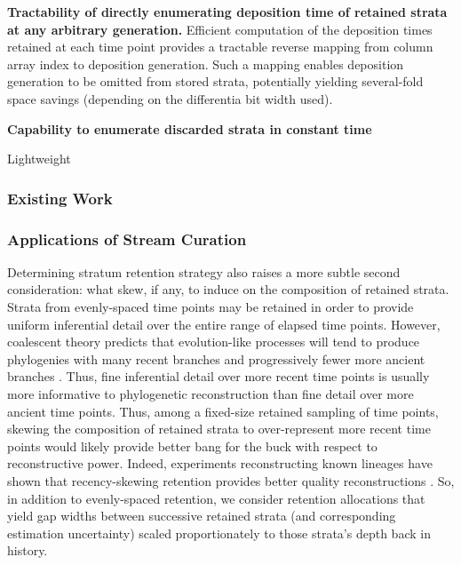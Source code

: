 \item \textbf{Tractability of directly enumerating deposition time of retained strata at any arbitrary generation.} Efficient computation of the deposition times retained at each time point provides a tractable reverse mapping from column array index to deposition generation.
  Such a mapping enables deposition generation to be omitted from stored strata, potentially yielding several-fold space savings (depending on the differentia bit width used).

\item \textbf{Capability to enumerate discarded strata in constant time}

Lightweight


\subsubsection{Existing Work}

\subsubsection{Applications of Stream Curation}

Determining stratum retention strategy also raises a more subtle second consideration: what skew, if any, to induce on the composition of retained strata.
Strata from evenly-spaced time points may be retained in order to provide uniform inferential detail over the entire range of elapsed time points.
However, coalescent theory predicts that evolution-like processes will tend to produce phylogenies with many recent branches and progressively fewer more ancient branches \citep{nordborgCoalescentTheory2019, berestyckiRecentProgressCoalescent2009}.
Thus, fine inferential detail over more recent time points is usually more informative to phylogenetic reconstruction than fine detail over more ancient time points.
Thus, among a fixed-size retained sampling of time points, skewing the composition of retained strata to over-represent more recent time points would likely provide better bang for the buck with respect to reconstructive power.
Indeed, experiments reconstructing known lineages have shown that recency-skewing retention provides better quality reconstructions \citep{moreno2022hereditary}.
So, in addition to evenly-spaced retention, we consider retention allocations that yield gap widths between successive retained strata (and corresponding estimation uncertainty) scaled proportionately to those strata's depth back in history.

